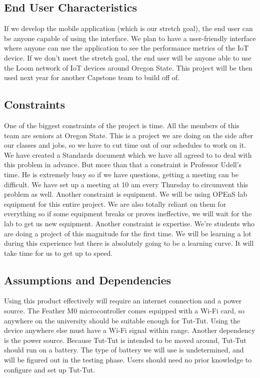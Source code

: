 \documentclass[letterpaper,10pt,draftclsnofoot,onecolumn]{article}
\begin{document}
\subsection{End User Characteristics}
If we develop the mobile application (which is our stretch goal), the end user can be anyone capable of using the interface. We plan to have a user-friendly interface where anyone can use the application to see the performance metrics of the IoT device.
\newline
If we don't meet the stretch goal, the end user will be anyone able to use the Loom network of IoT devices around Oregon State. This project will be then used next year for another Capstone team to build off of.

\subsection{Constraints}
One of the biggest constraints of the project is time. All the members of this team are seniors at Oregon State. This is a project we are doing on the side after our classes and jobs, so we have to cut time out of our schedules to work on it. We have created a Standards document which we have all agreed to to deal with this problem in advance.
\newline
But more than that a constraint is Professor Udell's time. He is extremely busy so if we have questions, getting a meeting can be difficult. We have set up a meeting at 10 am every Thursday to circumvent this problem as well.
\newline
Another constraint is equipment. We will be using OPEnS lab equipment for this entire project. We are also totally reliant on them for everything so if some equipment breaks or proves ineffective, we will wait for the lab to get us new equipment.
\newline
Another constraint is expertise. We're students who are doing a project of this magnitude for the first time. We will be learning a lot during this experience but there is absolutely going to be a learning curve. It will take time for us to get up to speed.

\subsection{Assumptions and Dependencies}
Using this product effectively will require an internet connection and a power source. The Feather M0 microcontroller comes equipped with a Wi-Fi card, so anywhere on the university should be suitable enough for Tut-Tut. Using the device anywhere else must have a Wi-Fi signal within range. Another dependency is the power source. Because Tut-Tut is intended to be moved around, Tut-Tut should run on a battery. The type of battery we will use is undetermined, and will be figured out in the testing phase. Users should need no prior knowledge to configure and set up Tut-Tut.
\end{document}
